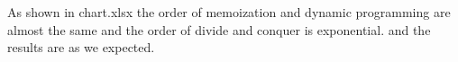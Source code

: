 \documentclass[12pt]{article}
\begin{document}
As shown in chart.xlsx the order of memoization and dynamic programming are almost
the same and the order of divide and conquer is exponential. and the results are
as we expected.
\end{document}
